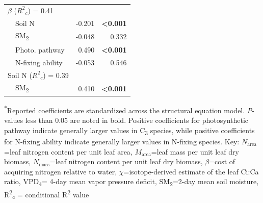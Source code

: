 \begin{table}
\begin{tabular}{p{0.5cm}p{3cm}p{1.5cm}p{1.5cm}}
            \multicolumn{2}{l}{$\beta$ ($R^2{}_c$) = 0.41} && \\
            & \multicolumn{1}{l}{Soil N} & \multicolumn{1}{r}{-0.201} & \multicolumn{1}{r}{\textbf{<0.001}} \\
            & \multicolumn{1}{l}{SM\textsubscript{2}} & \multicolumn{1}{r}{-0.048} & \multicolumn{1}{r}{0.332} \\
            & \multicolumn{1}{l}{Photo. pathway} & \multicolumn{1}{r}{0.490} & \multicolumn{1}{r}{\textbf{<0.001}} \\
            & \multicolumn{1}{l}{N-fixing ability} & \multicolumn{1}{r}{-0.053} & \multicolumn{1}{r}{0.546} \\
            \hline

            \multicolumn{2}{l}{Soil N ($R^2{}_c$) = 0.39} && \\
            & \multicolumn{1}{l}{SM\textsubscript{2}} & \multicolumn{1}{r}{0.410} & \multicolumn{1}{r}{\textbf{<0.001}} \\
            \hline

        \end{tabular}%
        \label{tab:table4.5}
    \end{table}
\begin{singlespace}
    \noindent \textsuperscript{$*$}Reported coefficients are standardized across the structural equation model. \textit{P}-values less than 0.05 are noted in bold. Positive coefficients for photosynthetic pathway indicate generally larger values in C\textsubscript{3} species, while positive coefficients for N-fixing ability indicate generally larger values in N-fixing species. Key: $N_\mathrm{area}$=leaf nitrogen content per unit leaf area, $M_\mathrm{area}$=leaf mass per unit leaf dry biomass, $N_\mathrm{mass}$=leaf nitrogen content per unit leaf dry biomass, $\beta$=cost of acquiring nitrogen relative to water, $\chi$=isotope-derived estimate of the leaf Ci:Ca ratio, VPD\textsubscript{4}= 4-day mean vapor pressure deficit, SM\textsubscript{2}=2-day mean soil moisture, R\textsuperscript{2}\textsubscript{c} = conditional R\textsuperscript{2} value
\end{singlespace}
\clearpage

